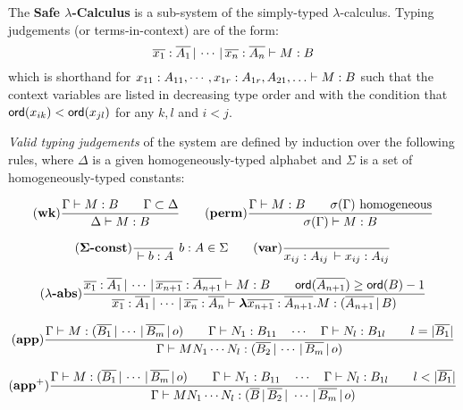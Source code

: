 The \textbf{Safe $\lambda$-Calculus} is a sub-system of the
simply-typed $\lambda$-calculus. Typing judgements (or
terms-in-context) are of the form:
\begin{equation}
\nonumber {{\overline{x_1}:\overline{A_1} \, | \, \cdots \, | \,
\overline{x_n} :  \overline{A_n}} \vdash {M : B}}
\end{equation}
which is shorthand for ${{x_{11} : A_{11}, \cdots, x_{1r}:
A_{1r}, A_{21},\ldots } \vdash {M : B}}$ such that the context variables are listed in decreasing type order and
 with the condition that ${\sf ord}(x_{ik}) < {\sf ord}(x_{jl})$ for any $k, l$ and $i<j$.

\emph{Valid typing judgements} of the system are defined by
induction over the following rules, where $\Delta$ is a given
homogeneously-typed alphabet and $\Sigma$ is a set of
homogeneously-typed constants:

$$ \mathbf{(wk)}
    {   \frac{\displaystyle  {{\Gamma} \vdash {M:B}} \qquad {\Gamma \subset \Delta} }{ {{\Delta } \vdash {M : B}}}
   }
\qquad
    \mathbf{(perm)}
    {
      \frac{\displaystyle  {{\Gamma} \vdash {M:B}} \qquad \sigma(\Gamma) \hbox{ homogeneous} }{ {{\sigma(\Gamma)} \vdash {M : B}} }
    }
$$

$$ \mathbf{(\Sigma\mbox{\textbf{-const}})}  \frac{\displaystyle }{{{} \vdash {b : A}}}\ b:A \in \Sigma
\qquad
 \mathbf{(var)} \frac{\displaystyle }{{{x_{ij} : A_{ij}\, } \vdash {x_{ij} : A_{ij}}}}
$$

$$ \mathbf{(\lambda\mbox{\textbf{-abs}})}
\frac{\displaystyle  {{{\overline{x_1} : \overline{A_1}\, | \, \cdots\, | \,
\overline{x_{n+1}} : \overline{A_{n+1}}} \vdash {M : B}}} \qquad
{\sf ord}(\overline{A_{n+1}}) \geq {\sf ord}(B) -1}{{{\overline{x_1} :
\overline{A_1}\, | \, \cdots\, | \, \overline{x_{n}} :
\overline{A_{n}}} \vdash {{\hbox{\boldmath $\lambda$}{\overline{x_{n+1}} : \overline{A_{n+1}}}.{M}}
: (\overline{A_{n+1}} \, | \, B)}}} $$

$$ \mathbf{(app)} \frac{\displaystyle {{{\Gamma} \vdash {M : (\overline{B_1} \, | \, \cdots \, | \, \overline{B_m} \, | \, o)}} \qquad
{{\Gamma} \vdash {N_1 : B_{11}}} \quad \cdots \quad {{\Gamma} \vdash {N_{l} :
B_{1l}}} \qquad l = |\overline{B_1}| }}{ {{\Gamma} \vdash {M N_1
\cdots N_{l} : (\overline{B_2} \, | \, \cdots \, | \,
\overline{B_m} \, | \, o)}}} $$

$$ \mathbf{(app^+)} \frac{\displaystyle {{\Gamma} \vdash {M : (\overline{B_1} \, | \, \cdots \, | \, \overline{B_m} \, | \, o)}} \qquad
    {{\Gamma} \vdash {N_1 : B_{11}}} \quad \cdots \quad {{\Gamma} \vdash {N_{l} :
    B_{1l}}} \qquad l < |\overline{B_1}| }{ {{\Gamma} \vdash {M N_1
    \cdots N_{l} : (\overline{B} \, | \, \overline{B_2} \, | \ \cdots \, | \,
    \overline{B_m} \, | \, o)}}} $$

